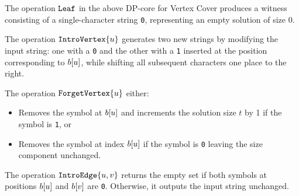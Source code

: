 
The operation $\texttt{Leaf}$ in the above DP-core for {\sc Vertex Cover} produces a witness consisting of a single-character string \texttt{0}, representing an empty solution of size 0.

The operation $\texttt{IntroVertex}\{u\}$ generates two new strings by modifying the input string: one with a \texttt{0} and the other with a \texttt{1} inserted at the position corresponding to $b[u]$, while shifting all subsequent characters one place to the right.

The operation $\texttt{ForgetVertex}\{u\}$ either:
\begin{itemize}
    \item Removes the symbol at $b[u]$ and increments the solution size \(t\) by 1 if the symbol is \texttt{1}, or
    \item Removes the symbol at index $b[u]$ if the symbol is \texttt{0} leaving the size component unchanged.
\end{itemize}

The operation $\texttt{IntroEdge}\{u,v\}$ returns the empty set if both symbols at positions $b[u]$ and $b[v]$ are \texttt{0}. Otherwise, it outputs the input string unchanged.

